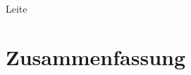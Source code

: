 \documentclass[conference,compsoc]{IEEEtran}
\begin{document}
Leite \cite{leite2013systematic}\\


\section{Zusammenfassung}



%
%







%
%
%









\end{document}
